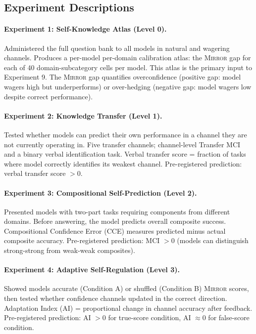 \documentclass[10pt]{article}
\newcommand{\mirror}{\textsc{Mirror}}
\newcommand{\MCI}{MCI}
\newcommand{\CCE}{CCE}
\newcommand{\AI}{AI}
\begin{document}
\subsection{Experiment Descriptions}

\paragraph{Experiment 1: Self-Knowledge Atlas (Level 0).}
Administered the full question bank to all models in natural and wagering channels.
Produces a per-model per-domain calibration atlas: the \mirror{} gap for each of 40
domain-subcategory cells per model. This atlas is the primary input to Experiment 9.
The \mirror{} gap quantifies overconfidence (positive gap: model wagers high but underperforms)
or over-hedging (negative gap: model wagers low despite correct performance).

\paragraph{Experiment 2: Knowledge Transfer (Level 1).}
Tested whether models can predict their own performance in a channel they are not
currently operating in. Five transfer channels; channel-level Transfer MCI and a binary
verbal identification task. Verbal transfer score = fraction of tasks where model
correctly identifies its weakest channel. Pre-registered prediction: verbal transfer
score $> 0$.

\paragraph{Experiment 3: Compositional Self-Prediction (Level 2).}
Presented models with two-part tasks requiring components from different domains.
Before answering, the model predicts overall composite success. Compositional Confidence
Error (\CCE) measures predicted minus actual composite accuracy. Pre-registered
prediction: \MCI{} $> 0$ (models can distinguish strong-strong from weak-weak composites).

\paragraph{Experiment 4: Adaptive Self-Regulation (Level 3).}
Showed models accurate (Condition A) or shuffled (Condition B) \mirror{} scores, then
tested whether confidence channels updated in the correct direction. Adaptation Index
(\AI) = proportional change in channel accuracy after feedback. Pre-registered prediction:
\AI{} $> 0$ for true-score condition, \AI{} $\approx 0$ for false-score condition.
\end{document}
